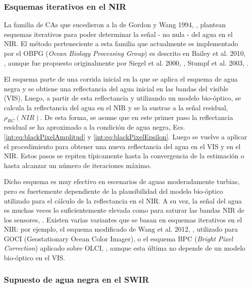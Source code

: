     	\subsubsection{Esquemas iterativos en el NIR}
    	\label{int:s:ACiterNIR}
    	    La familia de CAs que sucedieron a la de Gordon y Wang 1994, \cite{gordon1994}, plantean esquemas iterativos para poder determinar la señal - no nula - del agua en el NIR. El método perteneciente a esta familia que actualmente es implementado por el OBPG (\textit{Ocean Biology Processing Group}) es descrito en Bailey et al. 2010, \cite{bailey2010}, aunque fue propuesto originalmente por Siegel et al. 2000, \cite{siegel2000}, Stumpf et al. 2003, \cite{stumpf2003}.
    	    
    	    El esquema parte de una corrida inicial en la que se aplica el esquema de agua negra y se obtiene una reflectancia del agua inicial en las bandas del visible (VIS). Luego, a partir de esta reflectancia y utilizando un modelo bio-óptico, se calcula la reflectancia del agua en el NIR y se la sustrae a la señal residual, $\rho_{RC}(NIR)$. De esta forma, se asume que en este primer paso la reflectancia residual se ha aproximado a la condición de agua negra, Ecs. \ref{int:eq:blackPixelAmplitud} y \ref{int:eq:blackPixelEpsilon}. Luego se vuelve a aplicar el procedimiento para obtener una nueva reflectancia del agua en el VIS y en el NIR. Estos pasos se repiten típicamente hasta la convergencia de la estimación o hasta alcanzar un número de iteraciones máximo.
    	    
            Dicho esquema es muy efectivo en escenarios de aguas moderadamente turbias, pero es fuertemente dependiente de la plausibilidad del modelo bio-óptico utilizado para el cálculo de la reflectancia en el NIR. A su vez, la señal del agua es muchas veces lo suficientemente elevada como para saturar las bandas NIR de los sensores, \cite{dogliotti2011}. Existen varias variantes que se basan en esquemas iterativos en el NIR: por ejemplo, el esquema modificado de Wang et al. 2012, \cite{wang2012}, utilizado para GOCI (Geostationary Ocean Color Imager), o el esquema BPC (\textit{Bright Pixel Correction}) aplicado sobre OLCI, \cite{moore1999}\cite{moore2011}\cite{moore2017}\cite{lavender2005}, aunque esta última no depende de un modelo bio-óptico en el VIS.

    	\subsubsection{Supuesto de agua negra en el SWIR}
    	\label{int:s:ACswir}
    
